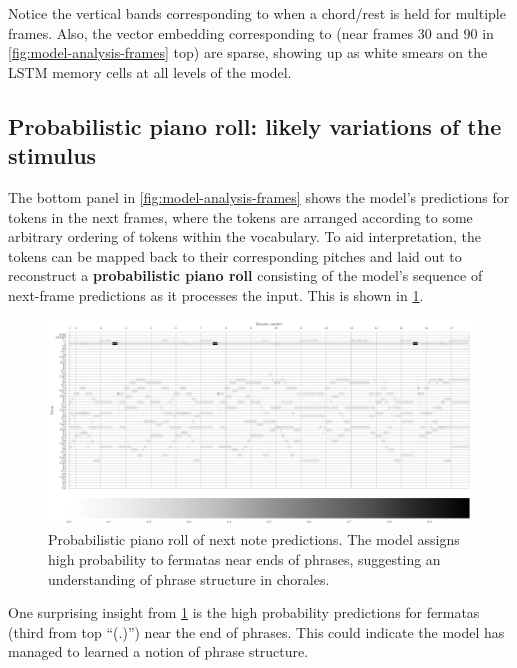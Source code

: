 Notice the vertical bands corresponding to when a chord/rest is held for
multiple frames. Also, the vector embedding corresponding to (\eg near frames
$30$ and $90$ in \cref{fig:model-analysis-frames} top) are sparse, showing up
as white smears on the LSTM memory cells at all levels of the model.

\subsection{Probabilistic piano roll: likely variations of the stimulus}

The bottom panel in \cref{fig:model-analysis-frames} shows the model's
predictions for tokens in the next frames, where the tokens are arranged
according to some arbitrary ordering of tokens within the vocabulary. To aid
interpretation, the tokens can be mapped back to their corresponding pitches
and laid out to reconstruct a {\bf probabilistic piano
roll}\citep{eck2008learning} consisting of the model's sequence of next-frame
predictions as it processes the input. This is shown in
\cref{fig:model-analysis-probabilistic-piano-roll}.

\begin{figure}[tb]
    \centering
    \includegraphics[trim={0 0 0 0},clip,width=1.0\linewidth]{model-analysis-probabilistic-piano-roll.pdf}
    \caption{Probabilistic piano roll of next note predictions.
        The model assigns high probability to fermatas near ends of phrases, suggesting
        an understanding of phrase structure in chorales.}
    \label{fig:model-analysis-probabilistic-piano-roll}
\end{figure}

One surprising insight from \cref{fig:model-analysis-probabilistic-piano-roll}
is the high probability predictions for fermatas (third from top ``(.)'') near
the end of phrases. This could indicate the model has managed to learned a
notion of phrase structure.

